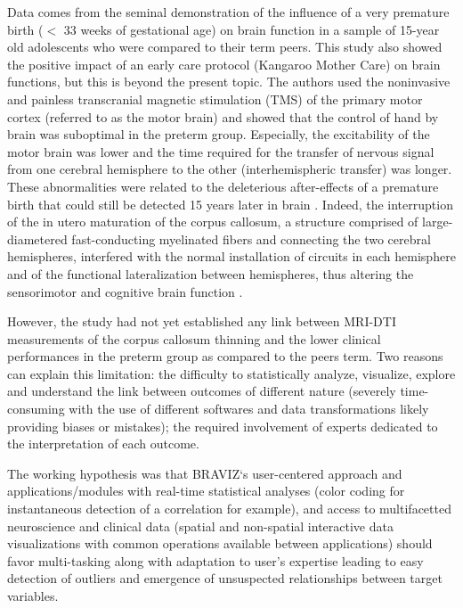 \documentclass{frontiersHLTH}
\begin{document}
Data comes from the seminal demonstration \cite{schneider_cerebral_2012} of the influence of a very premature birth ($<$ 33 weeks of gestational age) on brain function in a sample of 15-year old adolescents who were compared to their term peers. This study also showed the positive impact of an early care protocol (Kangaroo Mother Care) on brain functions, but this is beyond the present topic. The authors used the noninvasive and painless transcranial magnetic stimulation (TMS) of the primary motor cortex (referred to as the motor brain) and showed that the control of hand by brain was suboptimal in the preterm group. Especially, the excitability of the motor brain was lower and the time required for the transfer of nervous signal from one cerebral hemisphere to the other (interhemispheric transfer) was longer. These abnormalities were related to the deleterious after-effects of a premature birth that could still be detected 15 years later in brain  \cite{schneider_cerebral_2012}. Indeed, the interruption of the in utero maturation of the corpus callosum, a structure comprised of large-diametered fast-conducting myelinated fibers and connecting the two cerebral hemispheres, interfered with the normal installation of circuits in each hemisphere and of the functional lateralization between hemispheres, thus altering the sensorimotor and cognitive brain function \cite{schneider_cerebral_2012, schneider_visuo-motor_2008, flamand_brain_2012}.

However, the study had not yet established any link between MRI-DTI measurements of the corpus callosum thinning and the lower clinical performances in the preterm group as compared to the peers term. Two reasons can explain this limitation:  the difficulty to statistically analyze, visualize, explore and understand the link between outcomes of different nature (severely time-consuming with the use of different softwares and data transformations likely providing biases or mistakes); the required involvement of experts dedicated to the interpretation of each outcome.

The working hypothesis was that BRAVIZ‘s user-centered approach and applications/modules with real-time statistical analyses (color coding for instantaneous detection of a correlation for example), and access to multifacetted neuroscience and clinical data (spatial and non-spatial interactive data visualizations with common operations available between applications) should favor multi-tasking along with adaptation to user's expertise leading to easy detection of outliers and emergence of unsuspected relationships between target variables.
\end{document}
